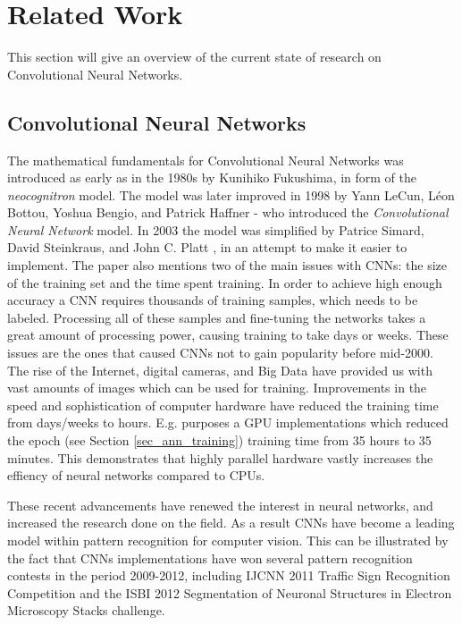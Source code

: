 \chapter{Related Work} \label{chap_related_work}

This section will give an overview of the current state of research on Convolutional Neural Networks. 

\section{Convolutional Neural Networks}
The mathematical fundamentals for Convolutional Neural Networks was introduced as early as in the 1980s by Kunihiko Fukushima\cite{Fukushima1980}\cite{Fukushima1982}, in form of the \textit{neocognitron} model. The model was later improved in 1998 by  Yann LeCun, Léon Bottou, Yoshua Bengio, and Patrick Haffner - who introduced the \textit{Convolutional Neural Network} model. In 2003 the model was simplified by Patrice Simard, David Steinkraus, and John C. Platt \cite{Simard2000}, in an attempt to make it easier to implement. The paper also mentions two of the main issues with CNNs: the size of the training set and the time spent training. In order to achieve high enough accuracy a CNN requires thousands of training samples, which needs to be labeled. Processing all of these samples and fine-tuning the networks takes a great amount of processing power, causing training to take days or weeks. These issues are the ones that caused CNNs not to gain popularity before mid-2000. The rise of the Internet, digital cameras, and Big Data have provided us with vast amounts of images which can be used for training. Improvements in the speed and sophistication of computer hardware have reduced the training time from days/weeks to hours. E.g. \cite{Cires2003} purposes a GPU implementations which reduced the epoch (see Section \ref{sec_ann_training}) training time from 35 hours to 35 minutes. This demonstrates that highly parallel hardware vastly increases the effiency of neural networks compared to CPUs. 

These recent advancements have renewed the interest in neural networks, and increased the research done on the field. As a result CNNs have become a leading model within pattern recognition for computer vision. This can be illustrated by the fact that CNNs implementations have won several pattern recognition contests in the period 2009-2012, including IJCNN 2011 Traffic Sign Recognition Competition\cite{Ciresan2012} and the ISBI 2012 Segmentation of Neuronal Structures in Electron Microscopy Stacks challenge\cite{DanC.Ciresan2012}.


